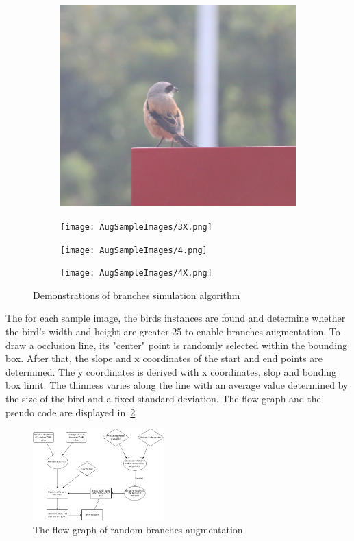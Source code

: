\begin{figure}[H]
    \vspace{0.5em}
    \begin{subfigure}{0.20\textwidth}
        \includegraphics[width=\linewidth]{AugSampleImages/3.png}
    \end{subfigure}
    \begin{subfigure}{0.20\textwidth}
        \texttt{[image: AugSampleImages/3X.png]}
    \end{subfigure}

    \vspace{0.5em}
    \begin{subfigure}{0.20\textwidth}
        \texttt{[image: AugSampleImages/4.png]}
    \end{subfigure}
    \begin{subfigure}{0.20\textwidth}
        \texttt{[image: AugSampleImages/4X.png]}
    \end{subfigure}
    
    \caption{Demonstrations of branches simulation algorithm}
    \label{aug-exp}
\end{figure}
The for each sample image, the birds instances 
are found and determine whether the bird's 
width and height are greater 25 to enable branches 
augmentation. To draw a occlusion line, its "center" point
is randomly selected within the bounding box. After that, 
the slope and x coordinates of the start and end points 
are determined. The y coordinates is derived with x coordinates,
slop and bonding box limit. The thinness varies along 
the line with an average value determined by the size of the 
bird and a fixed standard deviation. The flow graph and the pseudo 
code are displayed in~\ref{png:random-branch}
\begin{figure}[H]
    \includegraphics[width=0.45\textwidth]{bracn_aug.png}
    \caption{The flow graph of random branches augmentation}
    \label{png:random-branch}
\end{figure}
